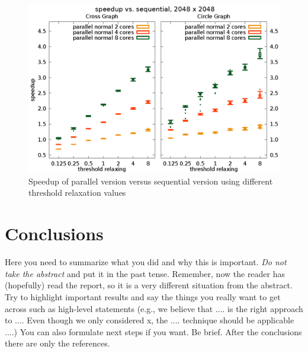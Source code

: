 \documentclass[letterpaper]{article}
\begin{document}
\begin{figure}[h]\centering
  \includegraphics[scale=0.558]{speedup_threshold.eps}
  \caption{Speedup of parallel version versus sequential version using different threshold relaxation values\label{fig:speedup_thresh}}
\end{figure}


\section{Conclusions}



Here you need to summarize what you did and why this is
important. {\em Do not take the abstract} and put it in the past
tense. Remember, now the reader has (hopefully) read the report, so it
is a very different situation from the abstract. Try to highlight
important results and say the things you really want to get across
such as high-level statements (e.g., we believe that .... is the right
approach to .... Even though we only considered x, the
.... technique should be applicable ....) You can also formulate next
steps if you want. Be brief. After the conclusions there are only the references.





\end{document}
